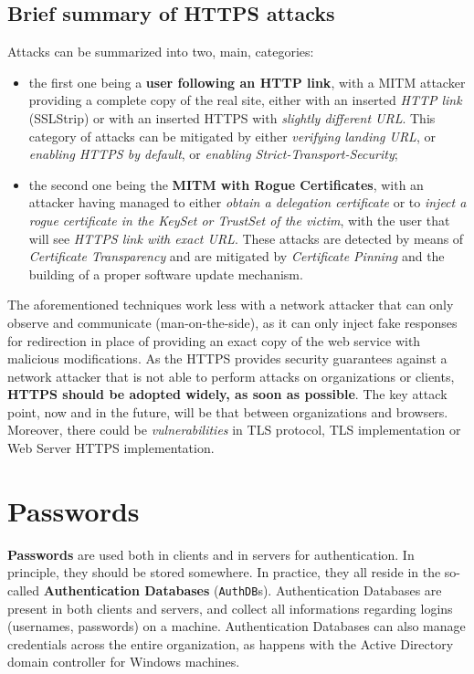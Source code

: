 \documentclass[10pt]{extreport}
\begin{document}
\section{Brief summary of HTTPS attacks}

Attacks can be summarized into two, main, categories: 
\begin{itemize}
    \item the first one being a \textbf{user following an HTTP link},
        with a MITM attacker providing a complete copy of the real site, either
        with an inserted \emph{HTTP link} (SSLStrip) or with an inserted HTTPS with
        \emph{slightly different URL}. This category of attacks can be
        mitigated by either \emph{verifying landing URL}, or \emph{enabling
        HTTPS by default}, or \emph{enabling Strict\--Transport\--Security};
    \item the second one being the \textbf{MITM with Rogue Certificates}, with
        an attacker having managed to either \emph{obtain a delegation
        certificate} or to \emph{inject a rogue certificate in the KeySet or
        TrustSet of the victim}, with the user that will see \emph{HTTPS link with
        exact URL}. These attacks are detected by means of \emph{Certificate
        Transparency} and are mitigated by \emph{Certificate Pinning} and the
        building of a proper software update mechanism.
\end{itemize}

The aforementioned techniques work less with a network attacker that can only
observe and communicate (man\--on\--the\--side), as it can only inject fake
responses for redirection in place of providing an exact copy of the web
service with malicious modifications. As the HTTPS provides security guarantees
against a network attacker that is not able to perform attacks on organizations
or clients, \textbf{HTTPS should be adopted widely, as soon as possible}. The
key attack point, now and in the future, will be that between organizations and
browsers. Moreover, there could be \emph{vulnerabilities} in TLS protocol, TLS
implementation or Web Server HTTPS implementation.


\chapter{Passwords}

\textbf{Passwords} are used both in clients and in servers for authentication.
In principle, they should be stored somewhere. In practice, they all reside in
the so\--called \textbf{Authentication Databases} (\texttt{AuthDB}s).
Authentication Databases are present in both clients and servers, and collect
all informations regarding logins (usernames, passwords) on a machine.
Authentication Databases can also manage credentials across the entire
organization, as happens with the Active Directory domain controller for
Windows machines.
\end{document}
